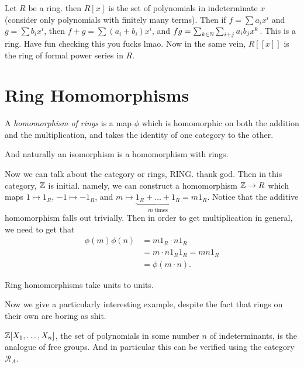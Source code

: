 \documentclass[12pt, twosided]{article}
\begin{document}
Let \(R\) be a ring. then \(R[x]\) is the set of polynomials in indeterminate \(x\) (consider only polynomials with finitely many terms). Then if \(f = \sum a_ix^i\) and \(g = \sum b_ix^i\), then \(f + g = \sum(a_i + b_i)x^i\), and \(fg = \sum_{k \in \mathbb{N}}\sum_{i + j}a_ib_jx^k\). This is a ring. Have fun checking this you fucks lmao. Now in the same vein, \(R[[x]]\) is the ring of formal power series in \(R\).

\section{Ring Homomorphisms}

\begin{df}
  A \textit{homomorphism of rings} is a map \(\phi\) which is homomorphic on both the addition and the multiplication, and takes the identity of one category to the other.
\end{df}

And naturally an isomorphism is a homomorphism with rings.

Now we can talk about the category or rings, RING. thank god. Then in this category, \(\mathbb{Z}\) is initial. namely, we can construct a homomorphism \(\mathbb{Z} \to R\) which maps \(1 \mapsto 1_R\), \(-1 \mapsto -1_R\), and \(m \mapsto \underbrace{1_R + \ldots + 1_R}_{m\ \mathrm{times}} = m1_R\). Notice that the additive homomorphism falls out trivially. Then in order to get multiplication in general, we need to get that
\begin{align*}
  \phi(m)\phi(n) &= m1_R \cdot n1_R \\
                 &= m \cdot n 1_R 1_R = mn 1_R \\
                 &=\phi(m \cdot n).
\end{align*}

\begin{cor}
  Ring homomorphisms take units to units.
\end{cor}

Now we give a particularly interesting example, despite the fact that rings on their own are boring as shit.

\begin{exa}
  \(\mathbb{Z}[X_1, \ldots, X_n]\), the set of polynomials in some number \(n\) of indeterminants, is the analogue of free groups. And in particular this can be verified using the category \(\mathcal{R}_A\).
\end{exa}
\end{document}
